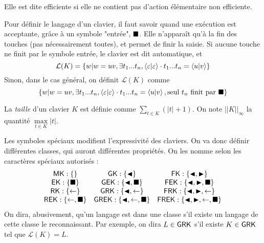 \documentclass[12pt, a4paper]{article}
\renewcommand{\L}{\mathcal{L}}
\newcommand{\Kinf}{||K||_{\infty}}
\begin{document}
    Elle est dite efficiente si elle ne contient pas d'action élémentaire non efficiente.

    Pour définir le langage d'un clavier, il faut savoir quand une exécution est acceptante, grâce à un symbole "entrée", $\mathord{\blacksquare}$. Elle n'apparaît qu'à la fin des touches (pas nécessairement toutes), et permet de finir la saisie.
    Si aucune touche ne finit par le symbole entrée, le clavier est dit automatique, et \[\L(K) = \{w | w =uv, \exists t_1...t_n, \conf{\varepsilon}{\varepsilon}\cdot t_1...t_n = \conf{u}{v}\}\]
    Sinon, dans le cas général, on définit $\L(K)$ comme \[\{w | w =uv, \exists t_1...t_n, \left\langle \varepsilon \middle| \varepsilon \right\rangle\cdot t_1...t_n = \left\langle u \middle| v \right\rangle, \mathrm{seul~} t_n \mathrm{~finit~par~\mathord{\blacksquare}}\}\]
    
    La \emph{taille} d'un clavier $K$ est définie comme $\sum_{t \in K} (|t| + 1)$.
    On note $\Kinf$ la quantité $\max\limits_{t \in K} |t|$.
    
    Les symboles spéciaux modifient l'expressivité des claviers. On va donc définir différentes classes, qui auront différentes propriétés. On les nomme selon les caractères spéciaux autorisés :
    \[
    \begin{array}{ccc}
        \mathsf{MK} : \{\} & \mathsf{GK} : \{\mathord{\blacktriangleleft}\} & \mathsf{FK} :\{\mathord{\blacktriangleleft},\mathord{\blacktriangleright}\} \\
        \mathsf{EK} : \{\mathord{\blacksquare}\} & \mathsf{GEK} : \{\mathord{\blacktriangleleft},\mathord{\blacksquare}\} & \mathsf{FEK} :\{\mathord{\blacktriangleleft},\mathord{\blacktriangleright},\mathord{\blacksquare}\} \\
        \mathsf{RK} : \{\mathord{\leftarrow}\} & \mathsf{GRK} : \{\mathord{\blacktriangleleft},\mathord{\leftarrow}\} & \mathsf{FRK} :\{\mathord{\blacktriangleleft},\mathord{\blacktriangleright},\mathord{\leftarrow}\} \\
        \mathsf{REK} : \{\mathord{\leftarrow}, \mathord{\blacksquare}\} & \mathsf{GREK} : \{\mathord{\blacktriangleleft},\mathord{\leftarrow},\mathord{\blacksquare}\} & \mathsf{FREK} :\{\mathord{\blacktriangleleft},\mathord{\blacktriangleright},\mathord{\leftarrow},\mathord{\blacksquare}\} \\
    \end{array}
    \]
    On dira, abusivement, qu'un langage est dans une classe s'il existe un langage de cette classe le reconnaissant. Par exemple, on dira $L \in \mathsf{GRK}$ s'il existe $K \in \mathsf{GRK}$ tel que $\L(K) = L$.
    \clearpage
\end{document}
